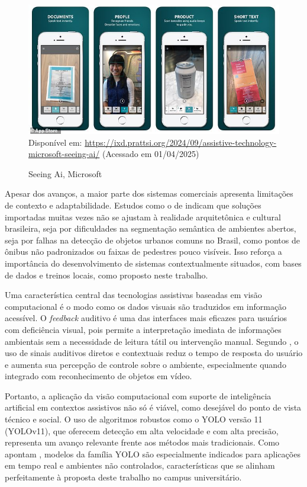 \begin{figure}[htbp]
  \centering
  \caption{Seeing Ai, Microsoft}
  \includegraphics[width=0.8 \textwidth]{Figuras/seeing-ai.jpg}
  \\
  Disponível em: \url{https://ixd.prattsi.org/2024/09/assistive-technology-microsoft-seeing-ai/} (Acessado em 01/04/2025)
  \label{fg-seeing-ai}
\end{figure}

Apesar dos avanços, a maior parte dos sistemas comerciais apresenta limitações de contexto e adaptabilidade. Estudos como o de  indicam que soluções importadas muitas vezes não se ajustam à realidade arquitetônica e cultural brasileira, seja por dificuldades na segmentação semântica de ambientes abertos, seja por falhas na detecção de objetos urbanos comuns no Brasil, como pontos de ônibus não padronizados ou faixas de pedestres pouco visíveis. Isso reforça a importância do desenvolvimento de sistemas contextualmente situados, com bases de dados e treinos locais, como proposto neste trabalho.

Uma característica central das tecnologias assistivas baseadas em visão computacional é o modo como os dados visuais são traduzidos em informação acessível. O \textit{feedback} auditivo é uma das interfaces mais eficazes para usuários com deficiência visual, pois permite a interpretação imediata de informações ambientais sem a necessidade de leitura tátil ou intervenção manual. Segundo , o uso de sinais auditivos diretos e contextuais reduz o tempo de resposta do usuário e aumenta sua percepção de controle sobre o ambiente, especialmente quando integrado com reconhecimento de objetos em vídeo.

Portanto, a aplicação da visão computacional com suporte de inteligência artificial em contextos assistivos não só é viável, como desejável do ponto de vista técnico e social. O uso de algoritmos robustos como o YOLO versão 11 (YOLOv11), que oferecem detecção em alta velocidade e com alta precisão, representa um avanço relevante frente aos métodos mais tradicionais. Como apontam , modelos da família YOLO são especialmente indicados para aplicações em tempo real e ambientes não controlados, características que se alinham perfeitamente à proposta deste trabalho no campus universitário.


